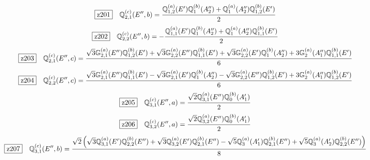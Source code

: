 \documentclass[fleqn,10pt,landscape]{jsarticle}
\begin{document}
\begin{dmath*}
\hspace*{3mm}\fbox{z201}\quad \mathbb{Q}_{2,1}^{(c)}(E^{\prime\prime},b)=\frac{\mathbb{Q}_{1,2}^{(a)}(E^{\prime}) \mathbb{Q}_{1}^{(b)}(A_{2}^{\prime\prime}) + \mathbb{Q}_{1}^{(a)}(A_{2}^{\prime\prime}) \mathbb{Q}_{1,2}^{(b)}(E^{\prime})}{2}
\end{dmath*}
\begin{dmath*}
\hspace*{3mm}\fbox{z202}\quad \mathbb{Q}_{2,2}^{(c)}(E^{\prime\prime},b)=- \frac{\mathbb{Q}_{1,1}^{(a)}(E^{\prime}) \mathbb{Q}_{1}^{(b)}(A_{2}^{\prime\prime}) + \mathbb{Q}_{1}^{(a)}(A_{2}^{\prime\prime}) \mathbb{Q}_{1,1}^{(b)}(E^{\prime})}{2}
\end{dmath*}
\begin{dmath*}
\hspace*{3mm}\fbox{z203}\quad \mathbb{Q}_{2,1}^{(c)}(E^{\prime\prime},c)=\frac{\sqrt{3} \mathbb{G}_{2,1}^{(a)}(E^{\prime\prime}) \mathbb{Q}_{1,2}^{(b)}(E^{\prime}) + \sqrt{3} \mathbb{G}_{2,2}^{(a)}(E^{\prime\prime}) \mathbb{Q}_{1,1}^{(b)}(E^{\prime}) + \sqrt{3} \mathbb{G}_{2,2}^{(a)}(E^{\prime}) \mathbb{Q}_{1}^{(b)}(A_{2}^{\prime\prime}) + 3 \mathbb{G}_{2}^{(a)}(A_{1}^{\prime\prime}) \mathbb{Q}_{1,1}^{(b)}(E^{\prime})}{6}
\end{dmath*}
\begin{dmath*}
\hspace*{3mm}\fbox{z204}\quad \mathbb{Q}_{2,2}^{(c)}(E^{\prime\prime},c)=\frac{\sqrt{3} \mathbb{G}_{2,1}^{(a)}(E^{\prime\prime}) \mathbb{Q}_{1,1}^{(b)}(E^{\prime}) - \sqrt{3} \mathbb{G}_{2,1}^{(a)}(E^{\prime}) \mathbb{Q}_{1}^{(b)}(A_{2}^{\prime\prime}) - \sqrt{3} \mathbb{G}_{2,2}^{(a)}(E^{\prime\prime}) \mathbb{Q}_{1,2}^{(b)}(E^{\prime}) + 3 \mathbb{G}_{2}^{(a)}(A_{1}^{\prime\prime}) \mathbb{Q}_{1,2}^{(b)}(E^{\prime})}{6}
\end{dmath*}
\begin{dmath*}
\hspace*{3mm}\fbox{z205}\quad \mathbb{Q}_{3,1}^{(c)}(E^{\prime\prime},a)=\frac{\sqrt{2} \mathbb{Q}_{3,1}^{(a)}(E^{\prime\prime}) \mathbb{Q}_{0}^{(b)}(A_{1}^{\prime})}{2}
\end{dmath*}
\begin{dmath*}
\hspace*{3mm}\fbox{z206}\quad \mathbb{Q}_{3,2}^{(c)}(E^{\prime\prime},a)=\frac{\sqrt{2} \mathbb{Q}_{3,2}^{(a)}(E^{\prime\prime}) \mathbb{Q}_{0}^{(b)}(A_{1}^{\prime})}{2}
\end{dmath*}
\begin{dmath*}
\hspace*{3mm}\fbox{z207}\quad \mathbb{Q}_{3,1}^{(c)}(E^{\prime\prime},b)=\frac{\sqrt{2} \left(\sqrt{3} \mathbb{Q}_{3,1}^{(a)}(E^{\prime}) \mathbb{Q}_{2,2}^{(b)}(E^{\prime\prime}) + \sqrt{3} \mathbb{Q}_{3,2}^{(a)}(E^{\prime}) \mathbb{Q}_{2,1}^{(b)}(E^{\prime\prime}) - \sqrt{5} \mathbb{Q}_{3}^{(a)}(A_{1}^{\prime}) \mathbb{Q}_{2,1}^{(b)}(E^{\prime\prime}) + \sqrt{5} \mathbb{Q}_{3}^{(a)}(A_{2}^{\prime}) \mathbb{Q}_{2,2}^{(b)}(E^{\prime\prime})\right)}{8}
\end{dmath*}
\end{document}

